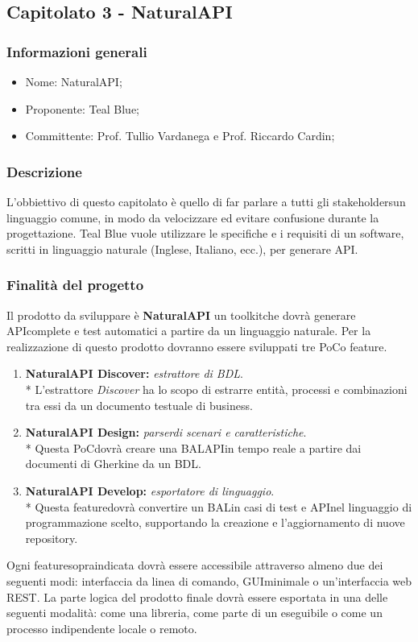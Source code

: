 \subsection{Capitolato 3 - NaturalAPI}
\subsubsection{Informazioni generali}
\begin{itemize}
	\item Nome: NaturalAPI;
	\item Proponente: Teal Blue;
	\item Committente: Prof. Tullio Vardanega e Prof. Riccardo Cardin;
\end{itemize}
\subsubsection{Descrizione}
L'obbiettivo di questo capitolato è quello di far parlare a tutti gli stakeholders\glosp un linguaggio comune, in modo da velocizzare ed evitare confusione durante la progettazione. Teal Blue vuole utilizzare le specifiche e i requisiti di un software, scritti in linguaggio naturale (Inglese, Italiano, ecc.), per generare API\glo.
\subsubsection{Finalità del progetto}
Il prodotto da sviluppare è \textbf{NaturalAPI} un toolkit\glosp che dovrà generare API\glosp complete e test automatici a partire da un linguaggio naturale. Per la realizzazione di questo prodotto dovranno essere sviluppati tre PoC\glosp o feature\glo.
\begin{enumerate}
	\item \textbf{NaturalAPI Discover: }\textit{estrattore di BDL\glo}. \\*
	L'estrattore \textit{Discover} ha lo scopo di estrarre entità, processi e combinazioni tra essi da un documento testuale di business.
	\item \textbf{NaturalAPI Design: }\textit{parser\glosp di scenari e caratteristiche}. \\*
	Questa PoC\glosp dovrà creare una BAL\glosp API\glosp in tempo reale a partire dai documenti di Gherkin\glosp e da un BDL\glo.
	\item \textbf{NaturalAPI Develop: }\textit{esportatore di linguaggio}. \\* 
	Questa feature\glosp dovrà convertire un BAL\glosp in casi di test e API\glosp nel linguaggio di programmazione scelto, supportando la creazione e l'aggiornamento di nuove repository\glo.
\end{enumerate} 
Ogni feature\glosp sopraindicata dovrà essere accessibile attraverso almeno due dei seguenti modi: interfaccia da linea di comando, GUI\glosp minimale o un'interfaccia web REST\glo.
La parte logica del prodotto finale dovrà essere esportata in una delle seguenti modalità: come una libreria, come parte di un eseguibile o come un processo indipendente locale o remoto.  


